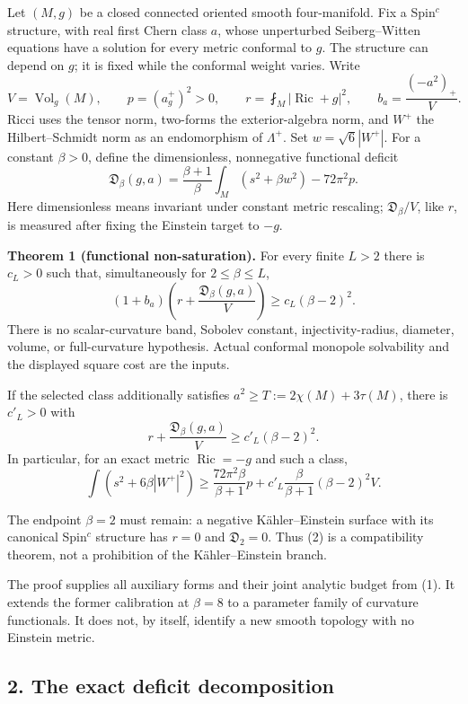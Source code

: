 \documentclass[
  10pt,
]{article}
\begin{document}
Let \((M,g)\) be a closed connected oriented smooth four-manifold. Fix a
Spin\(^c\) structure, with real first Chern class \(a\), whose
unperturbed Seiberg--Witten equations have a solution for every metric
conformal to \(g\). The structure can depend on \(g\); it is fixed while
the conformal weight varies. Write \[
V=\operatorname{Vol}_g(M),\qquad p=(a_g^+)^2>0,\qquad
r=\fint_M|\operatorname{Ric}+g|^2,\qquad
b_a=\frac{(-a^2)_+}{V}.
\] Ricci uses the tensor norm, two-forms the exterior-algebra norm, and
\(W^+\) the Hilbert--Schmidt norm as an endomorphism of \(\Lambda^+\).
Set \(w=\sqrt6|W^+|\). For a constant \(\beta>0\), define the
dimensionless, nonnegative functional deficit \[
\mathfrak D_\beta(g,a)
=\frac{\beta+1}{\beta}\int_M(s^2+\beta w^2)
-72\pi^2p.
\tag{1}
\] Here dimensionless means invariant under constant metric rescaling;
\(\mathfrak D_\beta/V\), like \(r\), is measured after fixing the
Einstein target to \(-g\).

\textbf{Theorem 1 (functional non-saturation).} For every finite \(L>2\)
there is \(c_L>0\) such that, simultaneously for \(2\le\beta\le L\), \[
\boxed{
(1+b_a)\left(r+\frac{\mathfrak D_\beta(g,a)}V\right)
\ge c_L(\beta-2)^2.
}
\tag{2}
\] There is no scalar-curvature band, Sobolev constant,
injectivity-radius, diameter, volume, or full-curvature hypothesis.
Actual conformal monopole solvability and the displayed square cost are
the inputs.

If the selected class additionally satisfies
\(a^2\ge T:=2\chi(M)+3\tau(M)\), there is \(c'_L>0\) with \[
\boxed{
r+\frac{\mathfrak D_\beta(g,a)}V\ge c'_L(\beta-2)^2.
}
\tag{3}
\] In particular, for an exact metric \(\operatorname{Ric}=-g\) and such
a class, \[
\int(s^2+6\beta|W^+|^2)
\ge\frac{72\pi^2\beta}{\beta+1}p
+c'_L\frac{\beta}{\beta+1}(\beta-2)^2V.
\tag{4}
\]

The endpoint \(\beta=2\) must remain: a negative Kähler--Einstein
surface with its canonical Spin\(^c\) structure has \(r=0\) and
\(\mathfrak D_2=0\). Thus (2) is a compatibility theorem, not a
prohibition of the Kähler--Einstein branch.

The proof supplies all auxiliary forms and their joint analytic budget
from (1). It extends the former calibration at \(\beta=8\) to a
parameter family of curvature functionals. It does not, by itself,
identify a new smooth topology with no Einstein metric.

\hypertarget{the-exact-deficit-decomposition}{%
\subsection{2. The exact deficit
decomposition}\label{the-exact-deficit-decomposition}}
\end{document}

